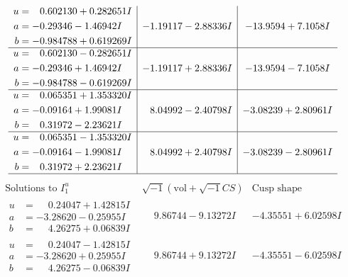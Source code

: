 \documentclass[1p]{elsarticle_modified}
\theoremstyle{definition}
\newcommand{\I}{\sqrt{-1}}
\begin{document}
$$\begin{array}{c|c|c}
\begin{aligned}
u &= \phantom{-}0.602130 + 0.282651 I \\
a &= -0.29346 - 1.46942 I \\
b &= -0.984788 + 0.619269 I\end{aligned}
 & -1.19117 - 2.88336 I & -13.9594 + 7.1058 I \\ \hline\begin{aligned}
u &= \phantom{-}0.602130 - 0.282651 I \\
a &= -0.29346 + 1.46942 I \\
b &= -0.984788 - 0.619269 I\end{aligned}
 & -1.19117 + 2.88336 I & -13.9594 - 7.1058 I \\ \hline\begin{aligned}
u &= \phantom{-}0.065351 + 1.353320 I \\
a &= -0.09164 + 1.99081 I \\
b &= \phantom{-}0.31972 - 2.23621 I\end{aligned}
 & \phantom{-}8.04992 - 2.40798 I & -3.08239 + 2.80961 I \\ \hline\begin{aligned}
u &= \phantom{-}0.065351 - 1.353320 I \\
a &= -0.09164 - 1.99081 I \\
b &= \phantom{-}0.31972 + 2.23621 I\end{aligned}
 & \phantom{-}8.04992 + 2.40798 I & -3.08239 - 2.80961 I\\
 \hline 
 \end{array}$$\newpage$$\begin{array}{c|c|c}  
\text{Solutions to }I^u_{1}& \I (\text{vol} + \sqrt{-1}CS) & \text{Cusp shape}\\
 \hline 
\begin{aligned}
u &= \phantom{-}0.24047 + 1.42815 I \\
a &= -3.28620 - 0.25955 I \\
b &= \phantom{-}4.26275 + 0.06839 I\end{aligned}
 & \phantom{-}9.86744 - 9.13272 I & -4.35551 + 6.02598 I \\ \hline\begin{aligned}
u &= \phantom{-}0.24047 - 1.42815 I \\
a &= -3.28620 + 0.25955 I \\
b &= \phantom{-}4.26275 - 0.06839 I\end{aligned}
 & \phantom{-}9.86744 + 9.13272 I & -4.35551 - 6.02598 I \\ \hline\begin{aligned}

\end{aligned}
\end{array}$$
\end{document}
